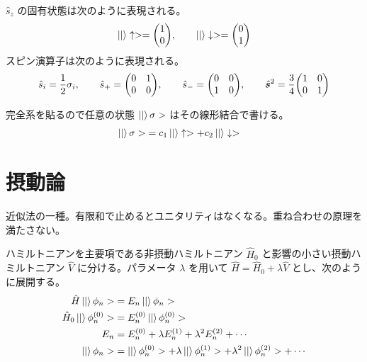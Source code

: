 \documentclass[uplatex,dvipdfmx,a4paper,11pt]{jlreq}
\numberwithin{equation}{section}
\theoremstyle{definition}
\begin{document}
\begin{proposition}
  $\hat{s}_z$ の固有状態は次のように表現される。
  \begin{align}
    \ket|\uparrow> = \mqty(1   \\ 0), \qquad
    \ket|\downarrow> = \mqty(0 \\ 1)
  \end{align}
  スピン演算子は次のように表現される。
  \begin{align}
    \hat{s}_i = \frac{1}{2}\sigma_i, \qquad
    \hat{s}_+ = \mqty(0                 & 1 \\ 0 & 0), \qquad
    \hat{s}_- = \mqty(0                 & 0 \\ 1 & 0), \qquad
    \hat{\bm{s}}^2 = \frac{3}{4}\mqty(1 & 0 \\ 0 & 1)
  \end{align}
\end{proposition}

\begin{proposition}
  完全系を貼るので任意の状態 $\ket|\sigma>$ はその線形結合で書ける。
  \begin{align}
    \ket|\sigma> & = c_1\ket|\uparrow> + c_2\ket|\downarrow>
  \end{align}


\end{proposition}



\section{摂動論}
近似法の一種。有限和で止めるとユニタリティはなくなる。重ね合わせの原理を満たさない。
\begin{definition}
  ハミルトニアンを主要項である非摂動ハミルトニアン $\hat{H}_0$ と影響の小さい摂動ハミルトニアン $\hat{V}$ に分ける。パラメータ $\lambda$ を用いて $\hat{H} = \hat{H}_0 + \lambda\hat{V}$ とし、次のように展開する。
  \begin{align}
    \hat{H}\ket|\phi_n>         & = E_n\ket|\phi_n>                                                                       \\
    \hat{H}_0\ket|\phi_n^{(0)}> & = E_n^{(0)}\ket|\phi_n^{(0)}>                                                           \\
    E_n                         & = E_n^{(0)} + \lambda E_n^{(1)} + \lambda^2E_n^{(2)} + \cdots                           \\
    \ket|\phi_n>                & = \ket|\phi_n^{(0)}> + \lambda\ket|\phi_n^{(1)}> + \lambda^2\ket|\phi_n^{(2)}> + \cdots
  \end{align}
\end{definition}
\end{document}
